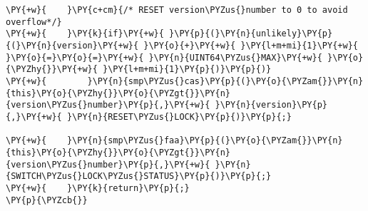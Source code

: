 \begin{Verbatim}[commandchars=\\\{\},codes={\catcode`\$=3\catcode`\^=7\catcode`\_=8\relax}]
\PY{+w}{    }\PY{c+cm}{/* RESET version\PYZus{}number to 0 to avoid overflow*/}
\PY{+w}{    }\PY{k}{if}\PY{+w}{ }\PY{p}{(}\PY{n}{unlikely}\PY{p}{(}\PY{n}{version}\PY{+w}{ }\PY{o}{+}\PY{+w}{ }\PY{l+m+mi}{1}\PY{+w}{ }\PY{o}{=}\PY{o}{=}\PY{+w}{ }\PY{n}{UINT64\PYZus{}MAX}\PY{+w}{ }\PY{o}{\PYZhy{}}\PY{+w}{ }\PY{l+m+mi}{1}\PY{p}{)}\PY{p}{)}
\PY{+w}{        }\PY{n}{smp\PYZus{}cas}\PY{p}{(}\PY{o}{\PYZam{}}\PY{n}{this}\PY{o}{\PYZhy{}}\PY{o}{\PYZgt{}}\PY{n}{version\PYZus{}number}\PY{p}{,}\PY{+w}{ }\PY{n}{version}\PY{p}{,}\PY{+w}{ }\PY{n}{RESET\PYZus{}LOCK}\PY{p}{)}\PY{p}{;}

\PY{+w}{    }\PY{n}{smp\PYZus{}faa}\PY{p}{(}\PY{o}{\PYZam{}}\PY{n}{this}\PY{o}{\PYZhy{}}\PY{o}{\PYZgt{}}\PY{n}{version\PYZus{}number}\PY{p}{,}\PY{+w}{ }\PY{n}{SWITCH\PYZus{}LOCK\PYZus{}STATUS}\PY{p}{)}\PY{p}{;}
\PY{+w}{    }\PY{k}{return}\PY{p}{;}
\PY{p}{\PYZcb{}}
\end{Verbatim}
